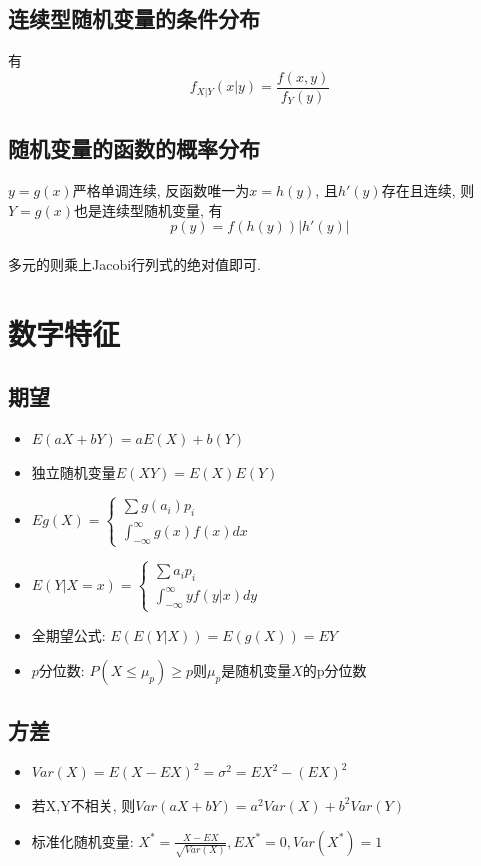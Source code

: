 \documentclass[UTF8]{article}
\begin{document}
\subsection{连续型随机变量的条件分布}
有
$$f_{X|Y}(x|y)=\frac{f(x,y)}{f_Y(y)}$$

\subsection{随机变量的函数的概率分布}
$y=g(x)$严格单调连续, 反函数唯一为$x=h(y)$, 且$h'(y)$存在且连续, 则$Y=g(x)$也是连续型随机变量, 有$$p(y)=f(h(y))|h'(y)|$$\\
多元的则乘上Jacobi行列式的绝对值即可.

\section{数字特征}
\subsection{期望}
\begin{itemize}
\item $E(aX+bY)=aE(X)+b(Y)$
\item 独立随机变量$E(XY)=E(X)E(Y)$
\item $Eg(X)=\left\{\begin{array}{c}
\sum g(a_i)p_i\\
\int_{-\infty}^{\infty}g(x)f(x)dx
\end{array}\right.$
\item $E(Y|X=x)=\left\{\begin{array}{c}
\sum a_ip_i\\
\int_{-\infty}^{\infty}yf(y|x)dy
\end{array}\right.$
\item 全期望公式: $E(E(Y|X))=E(g(X))=EY$
\item $p$分位数: $P(X\le\mu_p)\ge p$则$\mu_p$是随机变量$X$的p分位数
\end{itemize}
\subsection{方差}
\begin{itemize}
\item $Var(X)=E(X-EX)^2=\sigma^2=EX^2-(EX)^2$
\item 若X,Y不相关, 则$Var(aX+bY)=a^2Var(X)+b^2Var(Y)$
\item 标准化随机变量: $X^*=\frac{X-EX}{\sqrt{Var(X)}}, EX^*=0, Var(X^*)=1$
\end{itemize}
\end{document}
